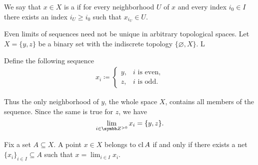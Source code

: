 \begin{definition}\label{def:net_cluster_point}\cite[50]{Engelking1989}
  We say that \( x \in X \) is a  if for every neighborhood \( U \) of \( x \) and every index \( i_0 \in I \) there exists an index \( i_U \geq i_0 \) such that \( x_{i_U} \in U \).
\end{definition}

\begin{example}\label{ex:multiple_limit_points_of_net}
  Even limits of sequences need not be unique in arbitrary topological spaces. Let \( X = \{ y, z \} \) be a binary set with the indiscrete topology \( \{ \varnothing, X \} \). L

  Define the following sequence
  \begin{align*}
    x_i \coloneqq \begin{cases}
      y, &i \text{ is even}, \\
      z, &i \text{ is odd}.
    \end{cases}
  \end{align*}

  Thus the only neighborhood of \( y \), the whole space \( X \), contains all members of the sequence. Since the same is true for \( z \), we have
  \begin{equation*}
    \lim_{i \in \Z^{>0}} x_i = \{ y, z \}.
  \end{equation*}
\end{example}

\begin{proposition}\label{thm:limit_point_iff_in_closure}\cite[proposition 1.6.3]{Engelking1989}
  Fix a set \( A \subseteq X \). A point \( x \in X \) belongs to \( \operatorname{cl}{A} \) if and only if there exists a net \( \{ x_i \}_{i \in I} \subseteq A \) such that \( x = \lim_{i \in I} x_i \).
\end{proposition}
